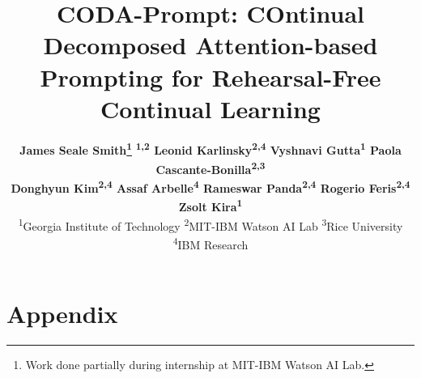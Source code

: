 \documentclass[10pt,twocolumn,letterpaper]{article}
\begin{document}
\title{CODA-Prompt: COntinual Decomposed Attention-based Prompting for Rehearsal-Free Continual Learning}



\author{
\textbf{
James Seale Smith\thanks{Work done partially during internship at MIT-IBM Watson AI Lab.}\,\,\textsuperscript{1,2}
\quad Leonid Karlinsky\textsuperscript{2,4}
\quad Vyshnavi Gutta\textsuperscript{1}
\quad Paola Cascante-Bonilla\textsuperscript{2,3}
}
\\
\textbf{
Donghyun Kim\textsuperscript{2,4}
\quad Assaf Arbelle\textsuperscript{4}
\quad Rameswar Panda\textsuperscript{2,4}
\quad Rogerio Feris\textsuperscript{2,4}
\quad Zsolt Kira\textsuperscript{1}
}
\\
\normalsize
\textsuperscript{1}Georgia Institute of Technology
\quad  \textsuperscript{2}MIT-IBM Watson AI Lab 
\normalsize
\quad \textsuperscript{3}Rice University
\quad \textsuperscript{4}IBM Research
}

\maketitle











{\small


}

\clearpage
\appendix
\section*{Appendix}
\setcounter{figure}{0}
\setcounter{table}{0}
\renewcommand{\thetable}{\Alph{table}}
\renewcommand{\thefigure}{\Alph{figure}}
\renewcommand\thesection{\Alph{section}}

\end{document}
